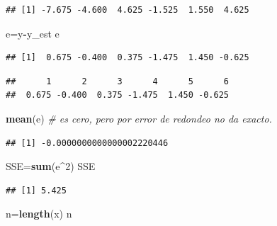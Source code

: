 \documentclass[
]{article}
\newenvironment{Shaded}{\begin{snugshade}}{\end{snugshade}}
\newcommand{\CommentTok}[1]{\textcolor[rgb]{0.56,0.35,0.01}{\textit{#1}}}
\newcommand{\DecValTok}[1]{\textcolor[rgb]{0.00,0.00,0.81}{#1}}
\newcommand{\KeywordTok}[1]{\textcolor[rgb]{0.13,0.29,0.53}{\textbf{#1}}}
\newcommand{\NormalTok}[1]{#1}
\newcommand{\OperatorTok}[1]{\textcolor[rgb]{0.81,0.36,0.00}{\textbf{#1}}}
\begin{document}
\begin{verbatim}
## [1] -7.675 -4.600  4.625 -1.525  1.550  4.625
\end{verbatim}

\begin{Shaded}
\begin{Highlighting}[]
\NormalTok{e=y}\OperatorTok{-}\NormalTok{y_est}
\NormalTok{e}
\end{Highlighting}
\end{Shaded}

\begin{verbatim}
## [1]  0.675 -0.400  0.375 -1.475  1.450 -0.625
\end{verbatim}

\begin{Shaded}
\end{Shaded}

\begin{verbatim}
##      1      2      3      4      5      6 
##  0.675 -0.400  0.375 -1.475  1.450 -0.625
\end{verbatim}

\begin{Shaded}
\begin{Highlighting}[]
\KeywordTok{mean}\NormalTok{(e) }\CommentTok{# es cero, pero por error de redondeo no da exacto.}
\end{Highlighting}
\end{Shaded}

\begin{verbatim}
## [1] -0.0000000000000002220446
\end{verbatim}

\begin{Shaded}
\begin{Highlighting}[]
\NormalTok{SSE=}\KeywordTok{sum}\NormalTok{(e}\OperatorTok{^}\DecValTok{2}\NormalTok{)}
\NormalTok{SSE}
\end{Highlighting}
\end{Shaded}

\begin{verbatim}
## [1] 5.425
\end{verbatim}

\begin{Shaded}
\begin{Highlighting}[]
\NormalTok{n=}\KeywordTok{length}\NormalTok{(x)}
\NormalTok{n}
\end{Highlighting}
\end{Shaded}
\end{document}
